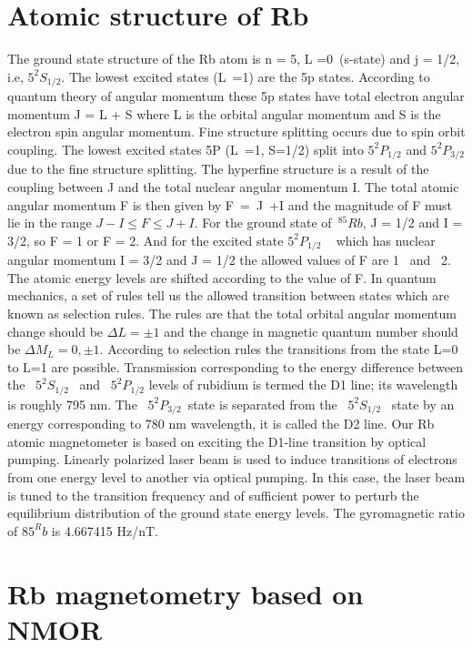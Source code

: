 \section{Atomic structure of Rb }
\label{sec:Rb structure} 
The ground state structure of the Rb atom is n = 5, L =0~(s-state) and j = 1/2, i.e, $5^2S_{1/2}$. The lowest excited states (L~=1) are the 5p states. According to quantum theory of angular momentum these 5p states have total electron angular momentum J = L + S where L is the orbital angular momentum and S is the electron spin angular momentum. Fine structure splitting occurs due to spin orbit coupling.  The lowest excited states 5P (L~=1, S=1/2) split into  $5^2P_{1/2}$ and $5^2P_{3/2}$  due to the fine structure splitting. The hyperfine structure is a result of the coupling between J and the total nuclear angular momentum I. The total atomic angular momentum F is then given by F~=~J~+I  and the magnitude of F must lie in the range
$J - I \leq F \leq J + I$. For the ground state of~$^{85}{Rb}$, J = 1/2 and I = 3/2, so F = 1 or F = 2. And  for the excited state $5^2P_{1/2}$ ~  which has nuclear angular momentum I = 3/2 and J = 1/2  the allowed values of F are  1 ~and~ 2. The atomic energy levels are shifted according to the value of F. In quantum mechanics, a set of rules tell us the allowed transition between states which are known as selection rules. The rules are that the total orbital angular momentum change should be $\Delta L= \pm 1$ and the change in magnetic quantum number should be $\Delta M_L= 0,\pm 1$. According to selection rules the transitions from the state L=0 to L=1 are possible. Transmission corresponding to the energy difference between the ~$5^2S_{1/2}$~ and~ $5^2P_{1/2}$ levels of rubidium is termed the D1 line; its wavelength is roughly 795 nm\cite{doe:website}.  The ~$5^2P_{3/2}$~state is separated from the ~$5^2S_{1/2}$~ state by an energy corresponding to 780 nm wavelength, it is called the D2 line. Our Rb atomic magnetometer is based on exciting the D1-line transition by optical pumping.  Linearly polarized laser beam is used to induce transitions of electrons from one energy level to another via optical pumping. In this case, the laser beam is tuned to the transition frequency and of sufficient power to perturb the equilibrium distribution of the ground state energy levels. The gyromagnetic ratio of ${85}^Rb$ is 4.667415 Hz/nT.

\section{Rb magnetometry based on NMOR}

